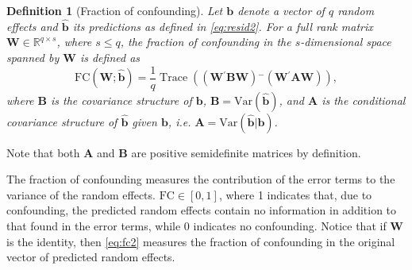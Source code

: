 \documentclass[12pt]{article} %
\newcommand{\hh}[1]{{\color{orange} #1}}
\newcommand{\al}[1]{{\color{red} #1}}
\newtheorem{definition}{Definition}
\newcommand{\ginv}{\ensuremath{^{-}}}
\newcommand{\trans}{\ensuremath{^\prime}}
\newcommand{\var}{\ensuremath{\mathrm{Var}}}
\DeclareMathOperator{\tr}{Trace}
\begin{document}


\begin{definition}[Fraction of confounding] 
Let $\bm{b}$ denote a vector of $q$ random effects and $\widehat{\bm{b}}$ its predictions as defined in \eqref{eq:resid2}. For a full rank matrix $\bm{W} \in \mathbb{R}^{q \times s}$, where $ s \le q$, the fraction of confounding in the $s$-dimensional space spanned by $\bm{W}$ is defined as 
\begin{equation}\label{eq:fc2}
\text{FC}(\bm{W}; \widehat{\bm{b}}) = \frac{1}{q} \tr\left( \left(\bm{W\trans B W} \right)\ginv \left(\bm{W\trans A W}\right) \right),
\end{equation}
where $\bm{B}$ is the covariance structure of $\bm b$, $\bm{B} = \var(\widehat{\bm{b}})$, and $\bm{A}$ is the conditional covariance structure of  $\widehat{\bm{b}}$ given $\bm{b}$,  i.e. $\bm{A} = \var(\widehat{\bm{b}} | \bm{b} )$.
\end{definition}
\noindent
Note that both $\bm{A}$ and $\bm{B}$ are  positive semidefinite matrices by definition. 


The fraction of confounding measures the contribution of the error terms  to the variance of the random effects. $\text{FC} \in [0,1]$, where 1 indicates that, due to confounding, the predicted random effects contain no information in addition to that found in the error terms, while 0 indicates no confounding. Notice that if $\bm{W}$ is the identity, then \eqref{eq:fc2} measures the fraction of confounding in the original vector of predicted random effects.
\end{document}
